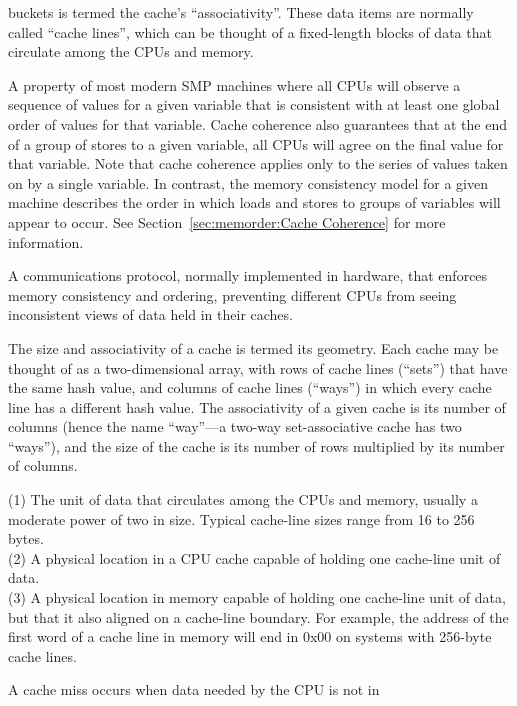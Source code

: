 \begin{description}
	buckets is termed the cache's ``associativity''.
	These data items are normally called ``cache lines'', which
	can be thought of a fixed-length blocks of data that circulate
	among the CPUs and memory.
\item[Cache Coherence:]
	A property of most modern SMP machines where all CPUs will
	observe a sequence of values for a given variable that is
	consistent with at least one global order of values for
	that variable.
	Cache coherence also guarantees that at the end of a group
	of stores to a given variable, all CPUs will agree
	on the final value for that variable.
	Note that cache coherence applies only to the series of values
	taken on by a single variable.
	In contrast, the memory consistency model for a given machine
	describes the order in which loads and stores to groups of
	variables will appear to occur.
	See Section~\ref{sec:memorder:Cache Coherence}
	for more information.
\item[Cache Coherence Protocol:]
	A communications protocol, normally implemented in hardware,
	that enforces memory consistency and ordering, preventing
	different CPUs from seeing inconsistent views of data held
	in their caches.
\item[Cache Geometry:]
	The size and associativity of a cache is termed its geometry.
	Each cache may be thought of as a two-dimensional array,
	with rows of cache lines (``sets'') that have the same hash
	value, and columns of cache lines (``ways'') in which every
	cache line has a different hash value.
	The associativity of a given cache is its number of
	columns (hence the name ``way''---a two-way set-associative
	cache has two ``ways''), and the size of the cache is its
	number of rows multiplied by its number of columns.
\item[Cache Line:]
	(1) The unit of data that circulates among the CPUs and memory,
	usually a moderate power of two in size.
	Typical cache-line sizes range from 16 to 256 bytes. \\
	(2) A physical location in a CPU cache capable of holding
	one cache-line unit of data. \\
	(3) A physical location in memory capable of holding one
	cache-line unit of data, but that it also aligned
	on a cache-line boundary.
	For example, the address of the first word of a cache line
	in memory will end in 0x00 on systems with 256-byte cache lines.
\item[\IX{Cache Miss}:]
	A cache miss occurs when data needed by the CPU is not in

\end{description}

